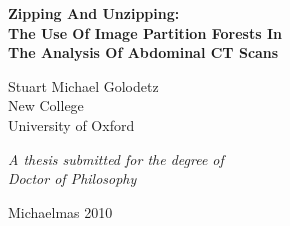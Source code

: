 \begin{titlepage}

\begin{center}

\vspace*{1cm}

\LARGE \textbf{Zipping And Unzipping:\\The Use Of Image Partition Forests In\\The Analysis Of Abdominal CT Scans}\\

\vspace{1cm}


\vspace{2mm}

\large Stuart Michael Golodetz\\
\normalsize New College \\
\normalsize University of Oxford

\vspace{2.5cm}

\textit{A thesis submitted for the degree of\\Doctor of Philosophy}

\vspace{2mm}

Michaelmas 2010

\end{center}

\end{titlepage}
